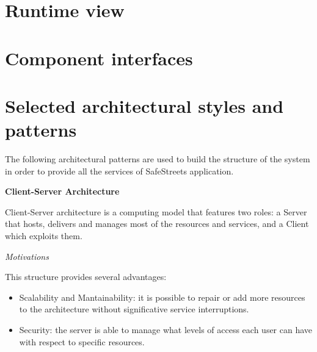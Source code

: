 \documentclass{report}
\begin{document}
\section{Runtime view}

\section{Component interfaces}

\section{Selected architectural	styles and patterns}
The following architectural patterns are used to build the structure of the system in order to provide all the services of SafeStreets application.\\

\begin{center}\large{\textbf{Client-Server Architecture}}\end{center}
Client-Server architecture is a computing model that features two roles: a Server that hosts, delivers and manages most of the resources and services, and a Client which exploits them.
\begin{center}\large{\textit{Motivations}}\end{center}
\noindent This structure provides several advantages:
\begin{itemize}
    \item Scalability and Mantainability: it is possible to repair or add more resources to the architecture without significative service interruptions.
    \item Security: the server is able to manage what levels of access each user can have with respect to specific resources.
\end{itemize}\vspace{2mm}
\end{document}
